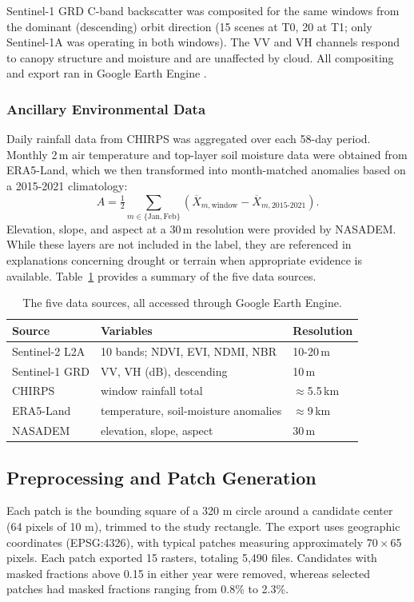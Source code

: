 \documentclass[11pt]{article}
\begin{document}
Sentinel-1 GRD C-band backscatter was composited for
the same windows from the dominant (descending) orbit direction (15
scenes at T0, 20 at T1; only Sentinel-1A was operating in both windows).
The VV and VH channels respond to canopy structure and moisture and are
unaffected by cloud. All compositing and export ran in Google Earth
Engine \citep{gorelick2017}.

\subsubsection{Ancillary Environmental Data}

Daily rainfall data from CHIRPS was aggregated over each 58-day period. Monthly 2\,m air temperature and top-layer soil moisture data were obtained from ERA5-Land, which we then transformed into month-matched anomalies based on a 2015-2021 climatology:  
\begin{equation}  
A=\tfrac{1}{2}\sum_{m\in\{\mathrm{Jan},\mathrm{Feb}\}}\left(\overline{X}_{m,\mathrm{window}}-\overline{X}_{m,2015\text{-}2021}\right).  
\label{eq:anomaly}  
\end{equation}  
Elevation, slope, and aspect at a 30\,m resolution were provided by NASADEM. While these layers are not included in the label, they are referenced in explanations concerning drought or terrain when appropriate evidence is available. Table~\ref{tab:sources} provides a summary of the five data sources.

\begin{table}[t]
\centering
\small
\begin{tabularx}{\columnwidth}{lXl}
\toprule
Source & Variables & Resolution \\
\midrule
Sentinel-2 L2A & 10 bands; NDVI, EVI, NDMI, NBR & 10-20\,m \\
Sentinel-1 GRD & VV, VH (dB), descending & 10\,m \\
CHIRPS & window rainfall total & $\approx$5.5\,km \\
ERA5-Land & temperature, soil-moisture anomalies & $\approx$9\,km \\
NASADEM & elevation, slope, aspect & 30\,m \\
\bottomrule
\end{tabularx}
\caption{The five data sources, all accessed through Google Earth Engine.}
\label{tab:sources}
\end{table}

\subsection{Preprocessing and Patch Generation}
Each patch is the bounding square of a 320 m circle around a candidate center (64 pixels of 10 m), trimmed to the study rectangle. The export uses geographic coordinates (EPSG:4326), with typical patches measuring approximately 70\,$\times$\,65 pixels. Each patch exported 15 rasters, totaling 5,490 files. Candidates with masked fractions above 0.15 in either year were removed, whereas selected patches had masked fractions ranging from 0.8\% to 2.3\%.
\end{document}

